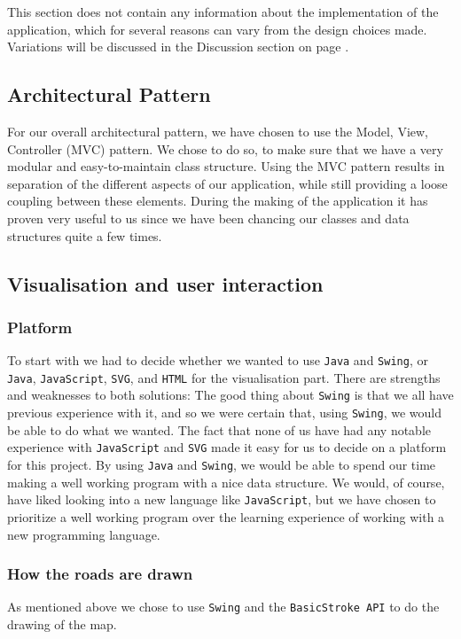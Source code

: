 \documentclass[a4paper,11pt]{article}
\begin{document}
This section does not contain any information about the implementation of the application, which for several reasons can vary from the design choices made. Variations will be discussed in the Discussion section on page \pageref{sec:Discussion}.

\subsection{Architectural Pattern}
\label{sub:Design Pattern}
For our overall architectural pattern, we have chosen to use the Model, View, Controller (MVC) pattern. We chose to do so, to make sure that we have a very modular and easy-to-maintain class structure. Using the MVC pattern results in separation of the different aspects of our application, while still providing a loose coupling between these elements. During the making of the application it has proven very useful to us since we have been chancing our classes and data structures quite a few times. 


\subsection{Visualisation and user interaction}

\subsubsection{Platform}
To start with we had to decide whether we wanted to use \texttt{Java} and \texttt{Swing}, or \texttt{Java}, \texttt{JavaScript}, \texttt{SVG}, and \texttt{HTML} for the visualisation part. There are strengths and weaknesses to both solutions: The good thing about \texttt{Swing} is that we all have previous experience with it, and so we were certain that, using \texttt{Swing}, we would be able to do what we wanted. 
The fact that none of us have had any notable experience with \texttt{JavaScript} and \texttt{SVG} made it easy for us to decide on a platform for this project. By using \texttt{Java} and \texttt{Swing}, we would be able to spend our time making a well working program with a nice data structure. We would, of course, have liked looking into a new language like \texttt{JavaScript}, but we have chosen to prioritize a well working program over the learning experience of working with a new programming language.

\subsubsection{How the roads are drawn}
As mentioned above we chose to use \texttt{Swing} and the \texttt{BasicStroke API} to do the drawing of the map. 
\end{document}
